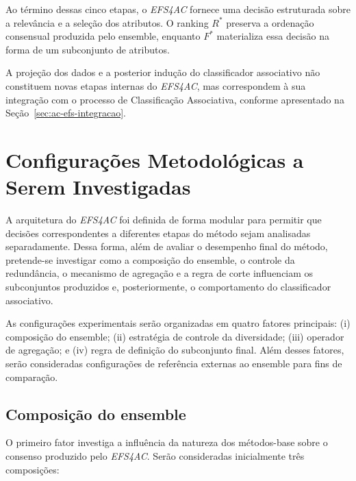 Ao término dessas cinco etapas, o \textit{EFS4AC} fornece uma decisão
estruturada sobre a relevância e a seleção dos atributos. O ranking
$R^{*}$ preserva a ordenação consensual produzida pelo ensemble, enquanto
$F^{*}$ materializa essa decisão na forma de um subconjunto de atributos.

A projeção dos dados e a posterior indução do classificador associativo não
constituem novas etapas internas do \textit{EFS4AC}, mas correspondem à sua
integração com o processo de Classificação Associativa, conforme apresentado
na Seção~\ref{sec:ac-efs-integracao}.

\section{Configurações Metodológicas a Serem Investigadas}
\label{sec:ac-efs-configuracoes}

A arquitetura do \textit{EFS4AC} foi definida de forma modular para permitir
que decisões correspondentes a diferentes etapas do método sejam analisadas
separadamente. Dessa forma, além de avaliar o desempenho final do método,
pretende-se investigar como a composição do ensemble, o controle da
redundância, o mecanismo de agregação e a regra de corte influenciam os
subconjuntos produzidos e, posteriormente, o comportamento do classificador
associativo.

As configurações experimentais serão organizadas em quatro fatores principais:
(i) composição do ensemble; (ii) estratégia de controle da diversidade;
(iii) operador de agregação; e (iv) regra de definição do subconjunto final.
Além desses fatores, serão consideradas configurações de referência externas
ao ensemble para fins de comparação.


\subsection{Composição do ensemble}
\label{subsec:ac-efs-config-composicao}

O primeiro fator investiga a influência da natureza dos métodos-base sobre o
consenso produzido pelo \textit{EFS4AC}. Serão consideradas inicialmente três
composições:

